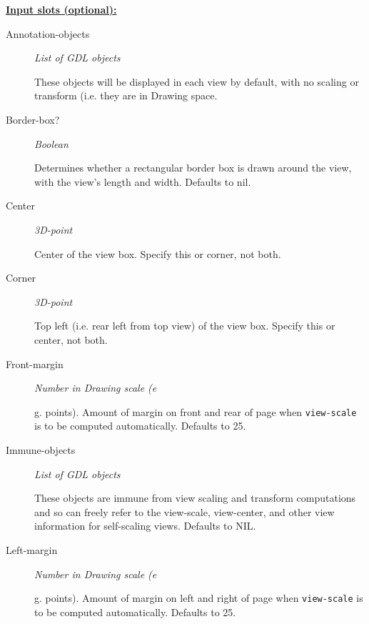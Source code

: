 \documentclass [11pt]{book}
\begin{document}
\begin{itemize}
\textbf{
\underline{Input slots (optional):}}

\begin{description}

\item [Annotation-objects]
\emph{List of GDL objects}

 These objects will be displayed in each view by default, with no scaling or transform (i.e. they are in Drawing space.




\item [Border-box?]
\emph{Boolean}

 Determines whether a rectangular border box is drawn around the view,
with the view's length and width. Defaults to nil.




\item [Center]
\emph{3D-point}

 Center of the view box. Specify this or corner, not both.




\item [Corner]
\emph{3D-point}

 Top left (i.e. rear left from top view) of the view box. Specify this or center, not both.




\item [Front-margin]
\emph{Number in Drawing scale (e}

g. points). Amount of margin on front and rear
of page when \texttt{view-scale} is to be computed automatically. Defaults to 25.




\item [Immune-objects]
\emph{List of GDL objects}

 These objects are immune from view scaling and transform computations and so can freely refer
to the view-scale, view-center, and other view information for self-scaling views. Defaults to NIL.




\item [Left-margin]
\emph{Number in Drawing scale (e}

g. points). Amount of margin on left and right
of page when \texttt{view-scale} is to be computed automatically. Defaults to 25.





\end{description}
\end{itemize}
\end{document}
